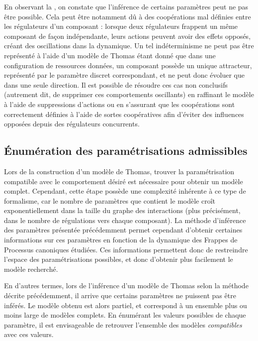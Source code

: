 En observant la , on constate que l'inférence
de certains paramètres peut ne pas être possible.
Cela peut être notamment dû à des coopérations mal définies entre les régulateurs d'un composant :
lorsque deux régulateurs frappent un même composant de façon indépendante, leurs actions peuvent
avoir des effets opposés, créant des oscillations dans la dynamique.
Un tel indéterminisme ne peut pas être représenté à l'aide d'un modèle de Thomas étant donné
que dans une configuration de ressources données, un composant possède un unique attracteur,
représenté par le paramètre discret correspondant,
et ne peut donc évoluer que dans une seule direction.
Il est possible de résoudre ces cas non conclusifs
(autrement dit, de supprimer ces comportements oscillants)
en raffinant le modèle à l'aide de suppressions d'actions ou
en s'assurant que les coopérations sont correctement définies à l'aide de sortes coopératives
afin d'éviter des influences opposées depuis des régulateurs concurrents.



\subsection{Énumération des paramétrisations admissibles}

Lors de la construction d'un modèle de Thomas, trouver la paramétrisation compatible avec
le comportement désiré est nécessaire pour obtenir un modèle complet.
Cependant, cette étape possède une complexité inhérente à ce type de formalisme,
car le nombre de paramètres que contient le modèle croît exponentiellement dans
la taille du graphe des interactions
(plus précisément, dans le nombre de régulations vers chaque composant).
La méthode d'inférence des paramètres présentée précédemment permet cependant d'obtenir
certaines informations sur ces paramètres en fonction de la dynamique des Frappes de Processus
canoniques étudiées.
Ces informations permettent donc de restreindre l'espace des paramétrisations possibles,
et donc d'obtenir plus facilement le modèle recherché.

En d'autres termes,
lors de l'inférence d'un modèle de Thomas selon la méthode décrite précédemment,
il arrive que certains paramètres ne puissent pas être inférés.
Le modèle obtenu est alors partiel, et correspond à un ensemble
plus ou moins large de modèles complets.
En énumérant les valeurs possibles de chaque paramètre, il est envisageable de retrouver
l'ensemble des modèles \emph{compatibles} avec ces valeurs.

